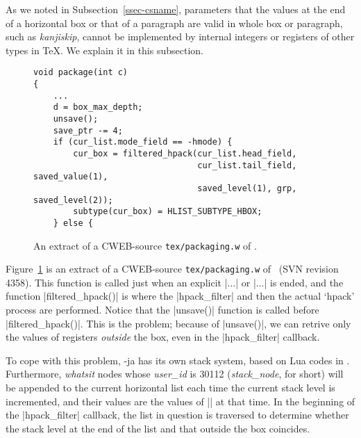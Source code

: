 \documentclass{ajt}
\begin{document}
As we noted in Subsection~\ref{ssec-csname}, parameters that the values
at the end of a horizontal box or that of a paragraph are valid in
whole box or paragraph, such as \emph{kanjiskip}, cannot be implemented
by internal integers or registers of other types in \TeX. We explain it
in this subsection.

\begin{figure}
\begin{lstlisting}
void package(int c)
{
    ...
    d = box_max_depth;
    unsave();
    save_ptr -= 4;
    if (cur_list.mode_field == -hmode) {
        cur_box = filtered_hpack(cur_list.head_field,
                                 cur_list.tail_field, saved_value(1),
                                 saved_level(1), grp, saved_level(2));
        subtype(cur_box) = HLIST_SUBTYPE_HBOX;
    } else {
\end{lstlisting}
\caption{An extract of a CWEB-source \texttt{tex/packaging.w} of \LuaTeX.}
\label{fig-ltsrc}
\end{figure}

Figure~\ref{fig-ltsrc} is an extract of a CWEB-source
\texttt{tex/packaging.w} of \LuaTeX\ (SVN revision 4358). This function
is called just when an explicit |\hbox{...}| or |\vbox{...}| is ended, and
the function |filtered_hpack()| is where the |hpack_filter| and then the
actual `hpack' process are performed. Notice that the |unsave()|
function is called before |filtered_hpack()|. This is the problem;
because of |unsave()|, we can retrive only the values of registers
\emph{outside} the box, even in the |hpack_filter| callback.

To cope with this problem, \LuaTeX-ja has its own stack system, based on
Lua codes in \cite{stack-mail}. Furthermore, \emph{whatsit} nodes whose
\emph{user\_id} is 30112 (\emph{stack\_node}, for short) will be
appended to the current horizontal list each time the current stack
level is incremented, and their values are the values of
|\currentgrouplevel| at that time. In the beginning of the |hpack_filter|
callback, the list in question is traversed to determine whether the
stack level at the end of the list and that outside the box coincides.
\end{document}
